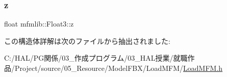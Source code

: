 \subsubsection{\texorpdfstring{z}{z}}
{\footnotesize\ttfamily float mfmlib\+::\+Float3\+::z}



この構造体詳解は次のファイルから抽出されました\+:\begin{DoxyCompactItemize}
\item 
C\+:/\+H\+A\+L/\+P\+G関係/03\+\_\+作成プログラム/03\+\_\+\+H\+A\+L授業/就職作品/\+Project/source/05\+\_\+\+Resource/\+Model\+F\+B\+X/\+Load\+M\+F\+M/\mbox{\hyperlink{_load_m_f_m_8h}{Load\+M\+F\+M.\+h}}\end{DoxyCompactItemize}

